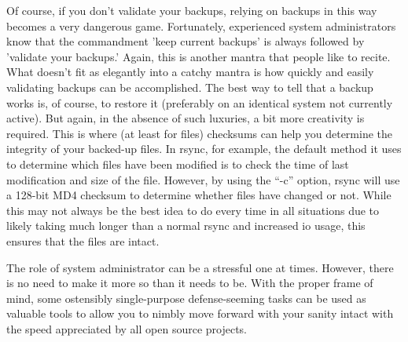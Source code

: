 Of course, if you don't validate your backups, relying on backups in this way becomes a very dangerous game.  Fortunately, experienced system administrators know that the commandment 'keep current backups' is always followed by 'validate your backups.' Again, this is another mantra that people like to recite.  What doesn't fit as elegantly into a catchy mantra is how quickly and easily validating backups can be accomplished. The best way to tell that a backup works is, of course, to restore it (preferably on an identical system not currently active). But again, in the absence of such luxuries, a bit more creativity is required. This is where (at least for files) checksums can help you determine the integrity of your backed-up files. In rsync, for example, the default method it uses to determine which files have been modified is to check the time of last modification and size of the file.  However, by using the “-c” option, rsync will use a 128-bit MD4 checksum to determine whether files have changed or not. While this may not always be the best idea to do every time in all situations due to likely taking much longer than a normal rsync and increased io usage, this ensures that the files are intact.

The role of system administrator can be a stressful one at times.  However, there is no need to make it more so than it needs to be.  With the proper frame of mind, some ostensibly single-purpose defense-seeming tasks can be used as valuable tools to allow you to nimbly move forward with your sanity intact with the speed appreciated by all open source projects.
